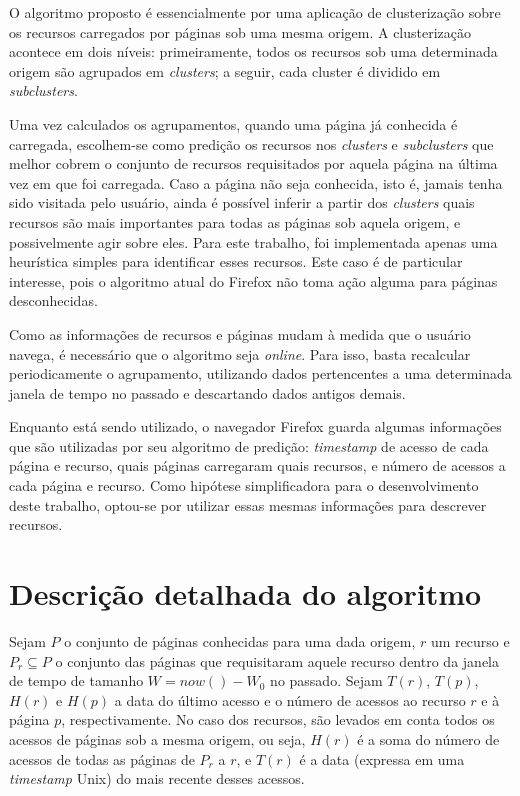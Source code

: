 \documentclass[10pt,twocolumn,letterpaper]{article}
\begin{document}
O algoritmo proposto é essencialmente por uma aplicação de clusterização sobre os recursos carregados por páginas sob uma mesma origem. A clusterização acontece em dois níveis: primeiramente, todos os recursos sob uma determinada origem são agrupados em \emph{clusters}; a seguir, cada cluster é dividido em \emph{subclusters}.

Uma vez calculados os agrupamentos, quando uma página já conhecida é carregada, escolhem-se como predição os recursos nos \emph{clusters} e \emph{subclusters} que melhor cobrem o conjunto de recursos requisitados por aquela página na última vez em que foi carregada. Caso a página não seja conhecida, isto é, jamais tenha sido visitada pelo usuário, ainda é possível inferir a partir dos \emph{clusters} quais recursos são mais importantes para todas as páginas sob aquela origem, e possivelmente agir sobre eles. Para este trabalho, foi implementada apenas uma heurística simples para identificar esses recursos. Este caso é de particular interesse, pois o algoritmo atual do Firefox não toma ação alguma para páginas desconhecidas. 

Como as informações de recursos e páginas mudam à medida que o usuário navega, é necessário que o algoritmo seja \emph{online}. Para isso, basta recalcular periodicamente o agrupamento, utilizando dados pertencentes a uma determinada janela de tempo no passado e descartando dados antigos demais.

Enquanto está sendo utilizado, o navegador Firefox guarda algumas informações que são utilizadas por seu algoritmo de predição: \emph{timestamp} de acesso de cada página e recurso, quais páginas carregaram quais recursos, e número de acessos a cada página e recurso. Como hipótese simplificadora para o desenvolvimento deste trabalho, optou-se por utilizar essas mesmas informações para descrever recursos.

\section{Descrição detalhada do algoritmo}
\label{sec-algorithm-detail}

Sejam $P$ o conjunto de páginas conhecidas para uma dada origem, $r$ um recurso e $P_{r} \subseteq P$ o conjunto das páginas que requisitaram aquele recurso dentro da janela de tempo de tamanho $W = now() - W_0$ no passado. Sejam $T(r)$,  $T(p)$, $H(r)$ e $H(p)$ a data do último acesso e o número de acessos ao recurso $r$ e à página $p$, respectivamente. No caso dos recursos, são levados em conta todos os acessos de páginas sob a mesma origem, ou seja, $H(r)$ é a soma do número de acessos de todas as páginas de $P_{r}$ a $r$, e $T(r)$ é a data (expressa em uma \emph{timestamp} Unix) do mais recente desses acessos.
\end{document}
